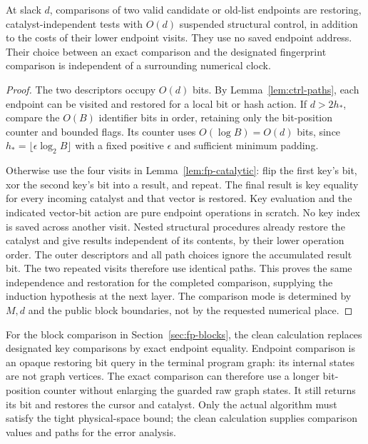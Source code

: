 \begin{lemma}\label{lem:ctrl-equality}
At slack $d$, comparisons of two valid candidate or old-list endpoints
are restoring, catalyst-independent tests with $O(d)$ suspended
structural control, in addition to the costs of their lower endpoint
visits.  They use no saved endpoint address.  Their choice between an
exact comparison and the designated fingerprint comparison is
independent of a surrounding numerical clock.
\end{lemma}

\begin{proof}
The two descriptors occupy $O(d)$ bits.  By
Lemma~\ref{lem:ctrl-paths}, each endpoint can be visited and restored for
a local bit or hash action.  If $d>2h_*$, compare the $O(B)$ identifier
bits in order, retaining only the bit-position counter and bounded
flags.  Its counter uses $O(\log B)=O(d)$ bits, since
$h_*=\lfloor\epsilon\log_2 B\rfloor$ with a fixed positive
$\epsilon$ and sufficient minimum padding.

Otherwise use the four visits in Lemma~\ref{lem:fp-catalytic}: flip the
first key's bit, xor the second key's bit into a result, and repeat.
The final result is key equality for every incoming catalyst and that
vector is restored.  Key evaluation and the indicated vector-bit
action are pure endpoint operations in scratch.  No key index is saved
across another visit.  Nested structural procedures already restore the
catalyst and give results independent of its contents, by their lower
operation order.  The outer descriptors and all path choices ignore
the accumulated result bit.  The two repeated visits therefore use
identical paths.  This proves the same independence and restoration
for the completed comparison, supplying the induction hypothesis at
the next layer.  The comparison mode is determined by $M,d$ and the
public block boundaries, not by the requested numerical place.
\end{proof}

For the block comparison in Section~\ref{sec:fp-blocks}, the clean
calculation replaces designated key comparisons by exact endpoint
equality.  Endpoint comparison is an opaque restoring bit query in the
terminal program graph: its internal states are not graph vertices.
The exact comparison can therefore use a longer bit-position counter
without enlarging the guarded raw graph states.  It still returns its
bit and restores the cursor and catalyst.  Only the actual algorithm
must satisfy the tight physical-space bound; the clean calculation
supplies comparison values and paths for the error analysis.


